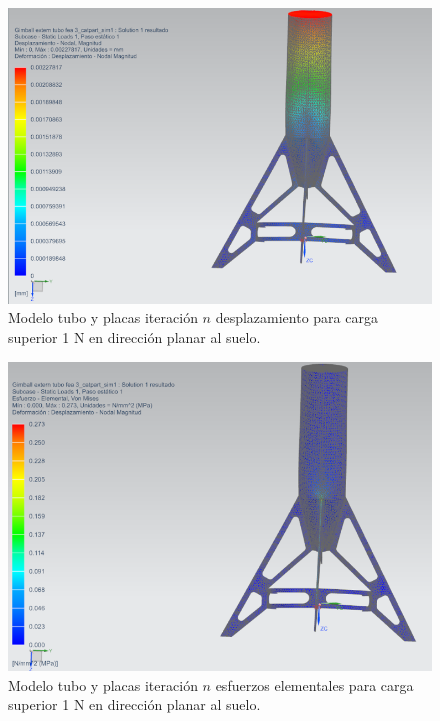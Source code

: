 \begin{figure}[htb]
    \centering
    \includegraphics[height=0.2\pdfpageheight]{fig/fea/patas1.png}
    \caption{Modelo tubo y placas iteración $n$ desplazamiento para carga superior 1 N en dirección planar al suelo.}
    \label{fig:fea/patas1}
\end{figure}

\begin{figure}[htb]
    \centering
    \includegraphics[height=0.25\pdfpageheight]{fig/fea/patas2.png}
    \caption{Modelo tubo y placas iteración $n$ esfuerzos elementales para carga superior 1 N en dirección planar al suelo.}
    \label{fig:fea/patas2}
\end{figure}

